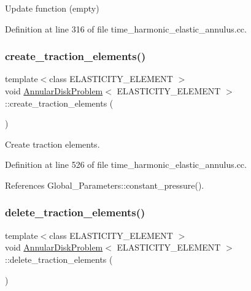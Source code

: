 Update function (empty) 



Definition at line 316 of file time\+\_\+harmonic\+\_\+elastic\+\_\+annulus.\+cc.

\mbox{\label{classAnnularDiskProblem_aeab547741d3b500af5f465e52e1ba57c}} 
\subsubsection{\texorpdfstring{create\+\_\+traction\+\_\+elements()}{create\_traction\_elements()}}
{\footnotesize\ttfamily template$<$class E\+L\+A\+S\+T\+I\+C\+I\+T\+Y\+\_\+\+E\+L\+E\+M\+E\+NT $>$ \\
void \hyperlink{classAnnularDiskProblem}{Annular\+Disk\+Problem}$<$ E\+L\+A\+S\+T\+I\+C\+I\+T\+Y\+\_\+\+E\+L\+E\+M\+E\+NT $>$\+::create\+\_\+traction\+\_\+elements (\begin{DoxyParamCaption}{ }\end{DoxyParamCaption})\hspace{0.3cm}{\ttfamily [private]}}



Create traction elements. 



Definition at line 526 of file time\+\_\+harmonic\+\_\+elastic\+\_\+annulus.\+cc.



References Global\+\_\+\+Parameters\+::constant\+\_\+pressure().

\mbox{\label{classAnnularDiskProblem_ae665013c94a3277cd1bf124158a4e8f2}} 
\subsubsection{\texorpdfstring{delete\+\_\+traction\+\_\+elements()}{delete\_traction\_elements()}}
{\footnotesize\ttfamily template$<$class E\+L\+A\+S\+T\+I\+C\+I\+T\+Y\+\_\+\+E\+L\+E\+M\+E\+NT $>$ \\
void \hyperlink{classAnnularDiskProblem}{Annular\+Disk\+Problem}$<$ E\+L\+A\+S\+T\+I\+C\+I\+T\+Y\+\_\+\+E\+L\+E\+M\+E\+NT $>$\+::delete\+\_\+traction\+\_\+elements (\begin{DoxyParamCaption}{ }\end{DoxyParamCaption})\hspace{0.3cm}{\ttfamily [private]}}



